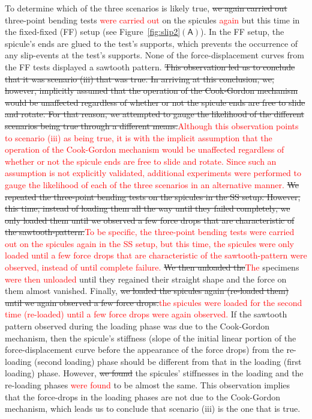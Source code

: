 \documentclass[preprint,10pt,times]{elsarticle}
\numberwithin{equation}{section}
\newcommand{\pr}[1]{\left( #1 \right)}
\newcommand{\subf}[1]{\pr{\textsf{#1}}}
\begin{document}
To determine which of the three scenarios is likely true, \sout{we again
carried out} three-point bending tests \textcolor{red}{were carried out} on the spicules \textcolor{red}{again} but this time
in the fixed-fixed (FF) setup (see Figure~\ref{fig:slip2}$\subf{A}$).
In the FF setup, the spicule's ends are glued to the test's supports,
which prevents the occurrence of any slip-events at the test's supports.
None of the force-displacement curves from the FF tests displayed
a sawtooth pattern. \sout{This observation led us to conclude that it was
scenario (iii) that was true. In arriving at this conclusion, we,
however, implicitly assumed that the operation of the Cook-Gordon
mechanism would be unaffected regardless of whether or not the spicule
ends are free to slide and rotate. For that reason, we attempted to
gauge the likelihood of the different scenarios being true through
a different means.}\textcolor{red}{Although this observation points to scenario (iii) as being true, it is with the implicit assumption that the operation of the Cook-Gordon
mechanism would be unaffected regardless of whether or not the spicule
ends are free to slide and rotate. Since such an assumption is not explicitly validated, additional experiments were performed to gauge the likelihood of each of the three scenarios in an alternative manner. } \sout{We repeated the three-point bending tests on the
spicules in the SS setup. However, this time, instead of loading them
all the way until they failed completely, we only loaded them until
we observed a few force drops that are characteristic of the sawtooth-pattern.}\textcolor{red}{To be specific, the three-point bending tests were carried out on the spicules again in the SS setup, but this time, the spicules were only loaded until a few force drops that are characteristic of the sawtooth-pattern were observed, instead of until complete failure.}
\sout{We then unloaded the}\textcolor{red}{The} specimens \textcolor{red}{were then unloaded} until they regained their straight
shape and the force on them almost vanished. Finally, \sout{we loaded the
spicules again (re-loaded them) until we again observed a few force
drops.}\textcolor{red}{the spicules were loaded for the second time (re-loaded) until a few force drops were again observed.} If the sawtooth pattern observed during the loading phase was
due to the Cook-Gordon mechanism, then the spicule's stiffness (slope
of the initial linear portion of the force-displacement curve before
the appearance of the force drops) from the re-loading (second loading)
phase should be different from that in the loading (first loading)
phase. However, \sout{we found} the spicules' stiffnesses in the loading
and the re-loading phases \textcolor{red}{were found }to be almost the same. This observation
implies that the force-drops in the loading phases are not due to
the Cook-Gordon mechanism, which leads us to conclude that scenario (iii)
is the one that is true.
\end{document}
